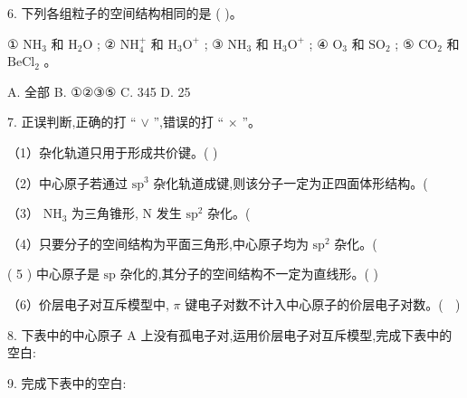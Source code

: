 \documentclass[10pt]{article}
\begin{document}
6. 下列各组粒子的空间结构相同的是 ( )。

① \({\mathrm{{NH}}}_{3}\) 和 \({\mathrm{H}}_{2}\mathrm{O}\) ; ② \({\mathrm{{NH}}}_{4}^{ + }\) 和 \({\mathrm{H}}_{3}{\mathrm{O}}^{ + }\) ; ③ \({\mathrm{{NH}}}_{3}\) 和 \({\mathrm{H}}_{3}{\mathrm{O}}^{ + }\) ; ④ \({\mathrm{O}}_{3}\) 和 \({\mathrm{{SO}}}_{2}\) ; ⑤ \({\mathrm{{CO}}}_{2}\) 和 \({\mathrm{{BeCl}}}_{2}\) 。

A. 全部 B. ①②③⑤ C. 345 D. 25

7. 正误判断,正确的打 “ \(\vee\) ”,错误的打 “ \(\times\) ”。

（1）杂化轨道只用于形成共价键。( )

（2）中心原子若通过 \({\mathrm{{sp}}}^{3}\) 杂化轨道成键,则该分子一定为正四面体形结构。(

（3） \({\mathrm{{NH}}}_{3}\) 为三角锥形, \(\mathrm{N}\) 发生 \({\mathrm{{sp}}}^{2}\) 杂化。(

（4）只要分子的空间结构为平面三角形,中心原子均为 \({\mathrm{{sp}}}^{2}\) 杂化。(

( 5 ) 中心原子是 \(\mathrm{{sp}}\) 杂化的,其分子的空间结构不一定为直线形。( )

（6）价层电子对互斥模型中, \(\pi\) 键电子对数不计入中心原子的价层电子对数。( \(\;\) )

8. 下表中的中心原子 \(\mathrm{A}\) 上没有孤电子对,运用价层电子对互斥模型,完成下表中的空白:

\begin{center}
\end{center}

9. 完成下表中的空白:
\end{document}
